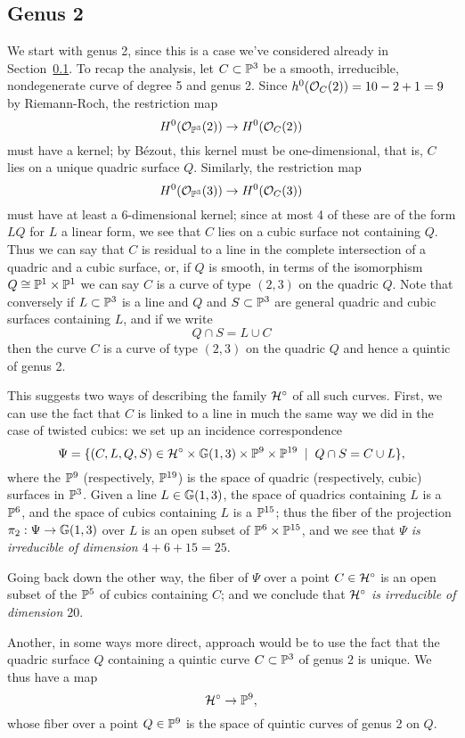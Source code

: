 \subsection{Genus 2}

We start with genus 2, since this is a case we've considered already in Section~\ref{}.  To recap the analysis, let $C \subset \PP^3$ be a smooth, irreducible, nondegenerate curve of degree 5 and genus 2. Since $h^0(\cO_C(2)) = 10-2+1 = 9$ by Riemann-Roch, the restriction map
$$
H^0(\cO_{\PP^3}(2)) \to H^0(\cO_C(2))
$$
must have a kernel; by B\'ezout, this kernel must be one-dimensional, that is, $C$ lies on a unique quadric surface $Q$. Similarly, the restriction map
$$
H^0(\cO_{\PP^3}(3)) \to H^0(\cO_C(3))
$$
must have at least a 6-dimensional kernel; since at most 4 of these are of the form $LQ$ for $L$ a linear form, we see that $C$ lies on a cubic surface not containing $Q$. Thus we can say that $C$ is residual to a line in the complete intersection of a quadric and a cubic surface, or, if $Q$ is smooth, in terms of the isomorphism $Q \cong \PP^1 \times \PP^1$ we can say $C$ is a curve of type $(2,3)$ on the quadric $Q$. Note that conversely if $L \subset \PP^3$ is a line and $Q$ and $S \subset \PP^3$ are general quadric and cubic surfaces containing $L$, and if we write
$$
Q \cap S = L \cup C
$$ 
then the curve $C$ is a curve of type $(2,3)$ on the quadric $Q$ and hence a quintic of genus 2.

This suggests two ways of describing the family $\cH^\circ$ of all such curves. First, we can use the fact that $C$ is linked to a line in much the same way we did in the case of twisted cubics: we set up an incidence correspondence
$$
\Psi = \{ (C, L, Q, S) \in \cH^\circ \times \GG(1,3) \times \PP^9 \times \PP^{19} \; \mid \; Q \cap S = C \cup L \},
$$
where the $\PP^9$ (respectively, $\PP^{19}$) is the space of quadric (respectively, cubic) surfaces in $\PP^3$. Given a line $L \in \GG(1,3)$, the space of quadrics containing $L$ is a $\PP^6$, and the space of cubics containing $L$ is a $\PP^{15}$; thus the fiber of the projection $\pi_2 : \Psi \to \GG(1,3)$ over $L$ is an open subset of $\PP^6 \times \PP^{15}$, and we see that \emph{$\Psi$ is irreducible of dimension $4 + 6 + 15 = 25$}.

Going back down the other way, the fiber of $\Psi$ over a point $C \in \cH^\circ$ is an open subset of the $\PP^5$ of cubics containing $C$; and we conclude that \emph{$\cH^\circ$ is irreducible of dimension $20$}.

Another, in some ways more direct, approach would be to use the fact that the quadric surface $Q$ containing a quintic curve $C \subset \PP^3$ of genus 2 is unique. We thus have a map
$$
\cH^\circ \to \PP^9,
$$
whose fiber over a point $Q \in \PP^9$ is the space of quintic curves of genus 2 on $Q$. 

